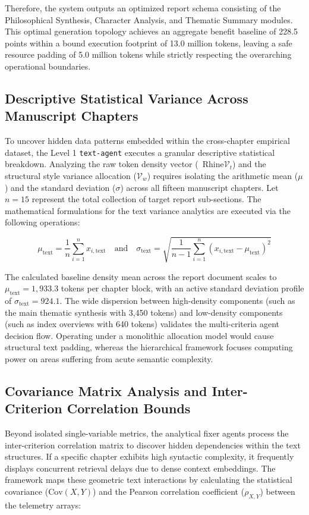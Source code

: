 Therefore, the system outputs an optimized report schema consisting of the Philosophical Synthesis, Character Analysis, and Thematic Summary modules. This optimal generation topology achieves an aggregate benefit baseline of 228.5 points within a bound execution footprint of 13.0 million tokens, leaving a safe resource padding of 5.0 million tokens while strictly respecting the overarching operational boundaries.

\subsection{Descriptive Statistical Variance Across Manuscript Chapters}
To uncover hidden data patterns embedded within the cross-chapter empirical dataset, the Level 1 \texttt{text-agent} executes a granular descriptive statistical breakdown. Analyzing the raw token density vector (\ Rhine\(\mathcal{V}_{t}\)) and the structural style variance allocation (\(\mathcal{V}_{w}\)) requires isolating the arithmetic mean (\(\mu\)) and the standard deviation (\(\sigma\)) across all fifteen manuscript chapters. Let \(n = 15\) represent the total collection of target report sub-sections. The mathematical formulations for the text variance analytics are executed via the following operations:

$$ \mu_{\text{text}} = \frac{1}{n} \sum_{i=1}^{n} x_{i,\text{text}} \quad \text{and} \quad \sigma_{\text{text}} = \sqrt{\frac{1}{n-1} \sum_{i=1}^{n} (x_{i,\text{text}} - \mu_{\text{text}})^{2}} $$

The calculated baseline density mean across the report document scales to \(\mu_{\text{text}} = 1,933.3\) tokens per chapter block, with an active standard deviation profile of \(\sigma_{\text{text}} = 924.1\). The wide dispersion between high-density components (such as the main thematic synthesis with 3,450 tokens) and low-density components (such as index overviews with 640 tokens) validates the multi-criteria agent decision flow. Operating under a monolithic allocation model would cause structural text padding, whereas the hierarchical framework focuses computing power on areas suffering from acute semantic complexity.

\subsection{Covariance Matrix Analysis and Inter-Criterion Correlation Bounds}
Beyond isolated single-variable metrics, the analytical fixer agents process the inter-criterion correlation matrix to discover hidden dependencies within the text structures. If a specific chapter exhibits high syntactic complexity, it frequently displays concurrent retrieval delays due to dense context embeddings. The framework maps these geometric text interactions by calculating the statistical covariance (\(\text{Cov}(X,Y)\)) and the Pearson correlation coefficient (\(\rho_{X,Y}\)) between the telemetry arrays:

